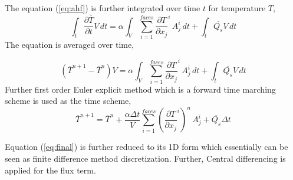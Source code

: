 The equation (\ref{eq:ahf}) is further integrated over time $t$ for temperature $T$,
\begin{equation}\label{eq:atime}
   \int_t \frac{\partial \overline{T}}{\partial t}V\,dt = \alpha \int_V \sum\limits_{i=1}^{faces}  \frac{\partial T}{\partial x_j}^i\,A_j^i\,dt+\int_t \overline{Q_s}V\,dt 
\end{equation}
The equation is averaged over time,

\begin{equation}\label{eq:atimen}
   (\overline{T}^{n+1}-\overline{T}^n)V = \alpha \int_V \sum\limits_{i=1}^{faces}  \frac{\partial T}{\partial x_j}^i\,A_j^i\,dt+\int_t \overline{Q_s}V\,dt 
\end{equation}
Further first order Euler explicit method which is a forward time marching scheme is used as the time scheme,
\begin{equation}\label{eq:final}
   \overline{T}^{n+1} =\overline{T}^n+ \frac{\alpha \Delta{t} }{V}  \sum\limits_{i=1}^{faces}  (\frac{\partial T}{\partial x_j}^i)^n\,A_j^i+\overline{Q_s} \Delta{t}
\end{equation}

Equation (\ref{eq:final}) is further reduced to its 1D form which essentially can be seen as finite difference method discretization. Further, Central differencing is applied for the flux term.

    



